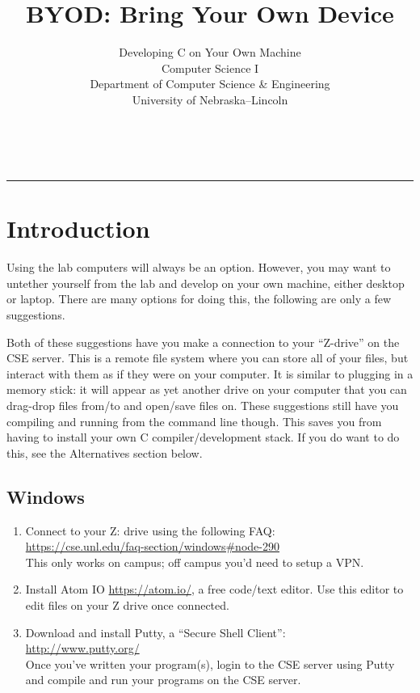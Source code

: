 \documentclass[12pt]{scrartcl}
\title{BYOD: Bring Your Own Device}\let\Title\@title
\subtitle{Developing C on Your Own Machine \\
Computer Science I\\
{\small
\vskip1cm
Department of Computer Science \& Engineering \\
University of Nebraska--Lincoln}
\vskip-1cm}
\date{~}
\begin{document}
\maketitle

\hrule

\section*{Introduction}

Using the lab computers will always be an option.  However, you may want to
untether yourself from the lab and develop on your own machine, either desktop
or laptop.  There are many options for doing this, the following are only
a few suggestions.

Both of these suggestions have you make a connection to your ``Z-drive'' 
on the CSE server.  This is a remote file system where you can store all
of your files, but interact with them as if they were on your computer.
It is similar to plugging in a memory stick: it will appear as yet another
drive on your computer that you can drag-drop files from/to and open/save
files on.  These suggestions still have you compiling and running from the
command line though.  This saves you from having to install your own C 
compiler/development stack.  If you do want to do this, see the 
Alternatives section below.

\subsection*{Windows}

\begin{enumerate} 
  \item Connect to your Z: drive using the following FAQ: \\
  \url{https://cse.unl.edu/faq-section/windows#node-290}\\
  This only works on campus; off campus you'd need to setup a VPN.
  \item Install Atom IO \url{https://atom.io/}, a free code/text 
  editor.  Use this editor to edit files on your Z drive once connected.
  \item Download and install Putty, a ``Secure Shell Client'': \\
  \url{http://www.putty.org/}\\
  Once you've written your program(s), login to the CSE server
  using Putty and compile and run your programs on the CSE server.
\end{enumerate}
\end{document}
